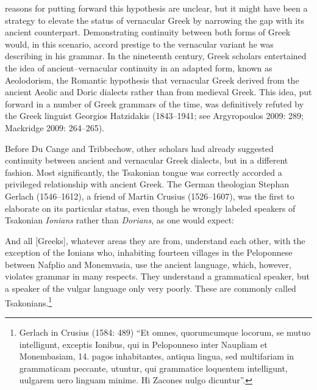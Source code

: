 \begin{styleStandard}
reasons for putting forward this hypothesis are unclear, but it might have been a strategy to elevate the status of vernacular Greek by narrowing the gap with its ancient counterpart. Demonstrating continuity between both forms of Greek would, in this scenario, accord prestige to the vernacular variant he was describing in his grammar. In the nineteenth century, Greek scholars entertained the idea of ancient–vernacular continuity in an adapted form, known as Aeolodorism, the Romantic hypothesis that vernacular Greek derived from the ancient Aeolic and Doric dialects rather than from medieval Greek. This idea, put forward in a number of Greek grammars of the time, was definitively refuted by the Greek linguist Georgios Hatzidakis (1843–1941; see Argyropoulos 2009: 289; Mackridge 2009: 264–265).
\end{styleStandard}

\begin{styleStandard}
Before Du Cange and Tribbechow, other scholars had already suggested continuity between ancient and vernacular Greek dialects, but in a different fashion. Most significantly, the Tsakonian tongue was correctly accorded a privileged relationship with ancient Greek. The German theologian Stephan Gerlach (1546–1612), a friend of Martin Crusius (1526–1607), was the first to elaborate on its particular status, even though he wrongly labeled speakers of Tsakonian \textit{Ionians} rather than \textit{Dorians}, as one would expect:
\end{styleStandard}

\begin{styleQuote}
And all [Greeks], whatever areas they are from, understand each other, with the exception of the Ionians who, inhabiting fourteen villages in the Peloponnese between Nafplio and Monemvasia, use the ancient language, which, however, violates grammar in many respects. They understand a grammatical speaker, but a speaker of the vulgar language only very poorly. These are commonly called Tsakonians.\footnote{ Gerlach in Crusius (1584: 489) “Et omnes, quorumcumque locorum, se mutuo intelligunt, exceptis Ionibus, qui in Peloponneso inter Naupliam et Monembasiam, 14. pagos inhabitantes, antiqua lingua, sed multifariam in grammaticam peccante, utuntur, qui grammatice loquentem intelligunt, uulgarem uero linguam minime. Hi Zacones uulgo dicuntur”.}
\end{styleQuote}

